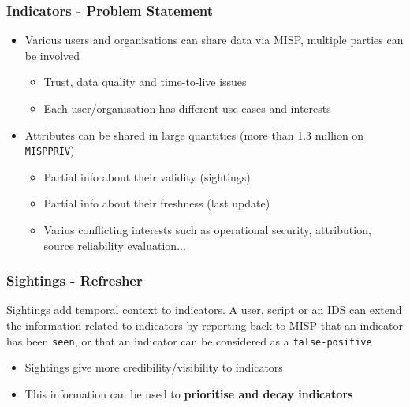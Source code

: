 
\begin{frame}[t,plain]
\titlepage
\end{frame}

\begin{frame}
\frametitle{Indicators - Problem Statement}
    \begin{itemize}
            \item Various users and organisations can share data via MISP, multiple parties can be involved
        \begin{itemize}
            \item Trust, data quality and time-to-live issues
            \item Each user/organisation has different use-cases and interests
        \end{itemize}
        \vspace{0.5cm}
        \item Attributes can be shared in large quantities (more than 1.3 million on \texttt{MISPPRIV})
        \begin{itemize}
            \item Partial info about their validity (sightings)
            \item Partial info about their freshness (last update)
            \item Varius conflicting interests such as operational security, attribution, source reliability evaluation...
        \end{itemize}
    \end{itemize}
\end{frame}

\begin{frame}
\frametitle{Sightings - Refresher}
    Sightings add temporal context to indicators.
    A user, script or an IDS can extend the information related to indicators by reporting back to MISP that
    an indicator has been \texttt{seen}, or that an indicator can be considered as a \texttt{false-positive}
    \vspace{0.5cm}
    \begin{itemize}
        \item Sightings give more credibility/visibility to indicators
        \item This information can be used to {\bf prioritise and decay indicators}
    \end{itemize}
\end{frame}

